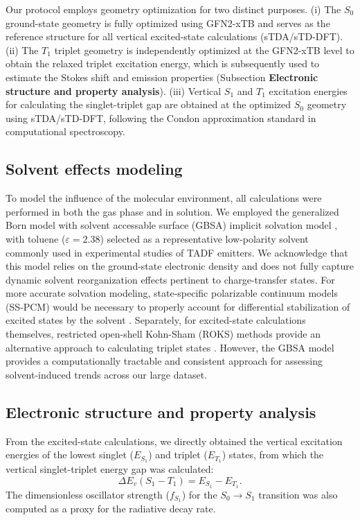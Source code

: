 \documentclass[journal=jcisd8,manuscript=article,keywords=true]{achemso}
\begin{document}
Our protocol employs geometry optimization for two distinct purposes.
(i) The $S_0$ ground-state geometry is fully optimized using GFN2-xTB and serves as the
reference structure for all vertical excited-state calculations (sTDA/sTD-DFT).
(ii) The $T_1$ triplet geometry is independently optimized at the GFN2-xTB level to obtain
the relaxed triplet excitation energy, which is subsequently used to estimate the Stokes
shift and emission properties (Subsection \textbf{Electronic structure and property analysis}).
(iii) Vertical $S_1$ and $T_1$ excitation energies for calculating the singlet-triplet
gap are obtained at the optimized $S_0$ geometry using sTDA/sTD-DFT, following the
Condon approximation standard in computational spectroscopy.


\subsection{Solvent effects modeling}\label{sec:solvation}

To model the influence of the molecular environment, all calculations were performed in
both the gas phase and in solution. We employed the generalized Born model with
solvent accessable surface (GBSA) implicit solvation model \cite{Ehlert2021}, with
toluene
($\varepsilon = \num{2.38}$) selected as a representative low-polarity solvent commonly
used in experimental studies of TADF emitters. We acknowledge that this model relies on
the ground-state electronic density and does not fully capture dynamic solvent
reorganization effects pertinent to charge-transfer states. For more accurate solvation modeling,
state-specific polarizable continuum models (SS-PCM) would be necessary to properly account for
differential stabilization of excited states by the solvent \cite{Hait2016}. Separately,
for excited-state calculations themselves, restricted open-shell Kohn-Sham (ROKS) methods provide
an alternative approach to calculating triplet states \cite{Northey2017}. However, the GBSA model provides a computationally
tractable and consistent approach for assessing solvent-induced trends across our large
dataset.

\subsection{Electronic structure and property analysis}\label{sec:analysis}

From the excited-state calculations, we directly obtained the vertical excitation energies
of the lowest singlet ($E_{S_1}$) and triplet ($E_{T_1}$) states, from which the vertical
singlet-triplet energy gap was calculated:
\begin{equation}
    \Delta E_{v}\left(S_1-T_1\right) = E_{S_1} - E_{T_1}.
\end{equation}
The dimensionless oscillator strength ($f_{S_1}$) for the $S_0 \to S_1$ transition was
also computed as a proxy for the radiative decay rate.
\end{document}
